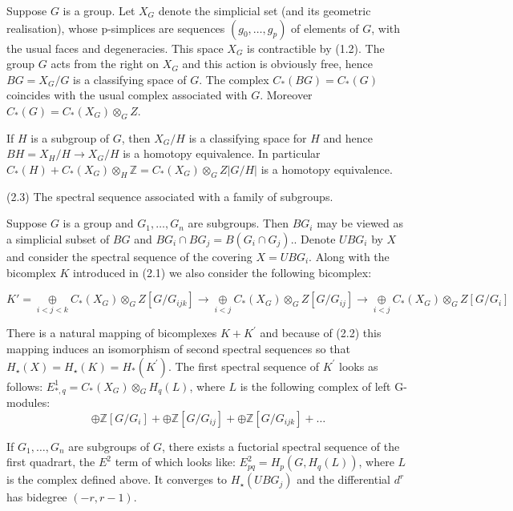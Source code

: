 Suppose $G$ is a group. Let $X_G$ denote the simplicial set (and its geometric realisation), whose p-simplices are sequences $\left(g_0, \ldots, g_p\right)$ of elements of $G$, with the usual faces and degeneracies. This space $X_G$ is contractible by (1.2). The group $G$ acts from the right on $X_G$ and this action is obviously free, hence $B G=X_G / G$ is a classifying space of $G$. The complex $C_*(B G)=C_*(G)$ coincides with the usual complex associated with $G$. Moreover $C_*(G)=C_*\left(X_G\right) \otimes_G Z$.

If $H$ is a subgroup of $G$, then $X_G / H$ is a classifying space for $H$ and hence $B H=X_H / H \rightarrow X_G / H$ is a homotopy equivalence. In particular $C_*(H)+C_*\left(X_G\right) \otimes_H \mathbb{Z}=C_*\left(X_G\right) \otimes_G Z|G / H|$ is a homotopy equivalence.

(2.3) The spectral sequence associated with a family of subgroups.

Suppose $G$ is a group and $G_1, \ldots, G_n$ are subgroups. Then $B G_i$ may be viewed as a simplicial subset of $B G$ and $B G_i \cap B G_j=B\left(G_i \cap G_j\right)$.. Denote $U B G_i$ by $X$ and consider the spectral sequence of the covering $X=U B G_i$. Along with the bicomplex $K$ introduced in (2.1) we also consider the following bicomplex:

$$K' = \underset{i<j<k}{\oplus} C_*\left(X_G\right) \otimes_G Z\left[G / G_{i j k}\right] \longrightarrow \underset{i<j}{\oplus} C_*\left(X_G\right) \otimes_G Z\left[G / G_{i j}\right] \longrightarrow \underset{i<j}{\oplus} C_*\left(X_G\right) \otimes_G Z\left[G / G_{i}\right] $$

There is a natural mapping of bicomplexes $K+K^{\prime}$ and because of (2.2) this mapping induces an isomorphism of second spectral sequences so that $H_{\star}(X)=H_{\star}(K)=H_*\left(K^{\prime}\right)$. The first spectral sequence of $K^{\prime}$ looks as follows: $E_{*, q}^1=C_*\left(X_G\right) \otimes_G H_q(L)$, where $L$ is the following complex of left G-modules:
$$
\oplus \mathbb{Z}\left[G / G_i\right]+\oplus \mathbb{Z}\left[G / G_{i j}\right]+\oplus \mathbb{Z}\left[G / G_{i j k}\right]+\ldots
$$


\begin{prop}
If $G_1, \ldots, G_n$ are subgroups of $G$, there exists a fuctorial spectral sequence of the first quadrart, the $E^2$ term of which looks like: $E_{p q}^2=H_p\left(G, H_q(L)\right)$, where $L$ is the complex defined above. It converges to $H_{\star}\left(U B G_j\right)$ and the differential $d^r$ has bidegree $(-r, r-1)$.   
\end{prop}


